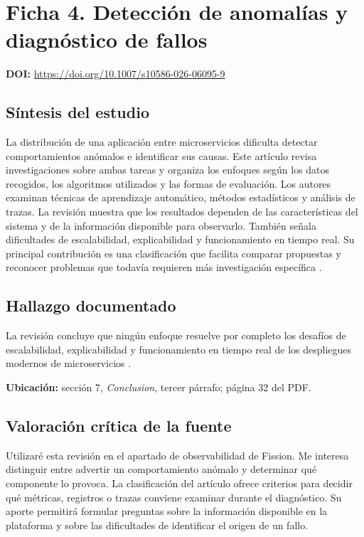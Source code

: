 \documentclass[11pt,a4paper]{article}
\newcommand{\tituloficha}[1]{\Needspace{5\baselineskip}\section*{#1}}
\newcommand{\doificha}[1]{\textbf{DOI:} \url{https://doi.org/#1}\par}
\begin{document}
\clearpage

\tituloficha{Ficha 4. Detección de anomalías y diagnóstico de fallos}

\doificha{10.1007/s10586-026-06095-9}

\subsection*{Síntesis del estudio}

La distribución de una aplicación entre microservicios dificulta detectar
comportamientos anómalos e identificar sus causas. Este artículo revisa
investigaciones sobre ambas tareas y organiza los enfoques según los datos
recogidos, los algoritmos utilizados y las formas de evaluación. Los autores
examinan técnicas de aprendizaje automático, métodos estadísticos y análisis
de trazas. La revisión muestra que los resultados dependen de las
características del sistema y de la información disponible para observarlo.
También señala dificultades de escalabilidad, explicabilidad y
funcionamiento en tiempo real. Su principal contribución es una
clasificación que facilita comparar propuestas y reconocer problemas que
todavía requieren más investigación específica
\cite{barata_anomaly_2026}.

\subsection*{Hallazgo documentado}

La revisión concluye que ningún enfoque resuelve por completo
los desafíos de escalabilidad, explicabilidad y funcionamiento
en tiempo real de los despliegues modernos de microservicios
\cite{barata_anomaly_2026}.

\textbf{Ubicación:} sección 7, \textit{Conclusion},
tercer párrafo; página 32 del PDF.

\subsection*{Valoración crítica de la fuente}

Utilizaré esta revisión en el apartado de observabilidad de Fission. Me
interesa distinguir entre advertir un comportamiento anómalo y determinar
qué componente lo provoca. La clasificación del artículo ofrece criterios
para decidir qué métricas, registros o trazas conviene examinar durante el
diagnóstico. Su aporte permitirá formular preguntas sobre la información
disponible en la plataforma y sobre las dificultades de identificar el
origen de un fallo.
\end{document}
